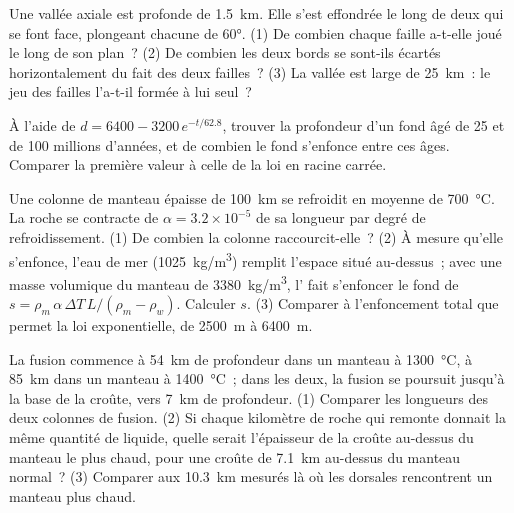 \begin{exercise}[$\star\star$]\label{exo:g11:ocean-ridges:10}
Une vallée axiale est profonde de \qty{1.5}{km}. Elle s'est effondrée le
long de deux  qui se font face, plongeant chacune de
\ang{60}. (1) De combien chaque faille a-t-elle joué le long de son plan~?
(2) De combien les deux bords se sont-ils écartés horizontalement du fait
des deux failles~? (3) La vallée est large de \qty{25}{km}~: le jeu des
failles l'a-t-il formée à lui seul~?
\end{exercise}

\begin{exercise}[$\star\star$]\label{exo:g11:ocean-ridges:11}
À l'aide de $d = 6400 - 3200\,e^{-t/62.8}$, trouver la profondeur d'un fond
âgé de 25 et de 100 millions d'années, et de combien le fond s'enfonce entre
ces âges. Comparer la première valeur à celle de la loi en racine carrée.
\end{exercise}

\begin{exercise}[$\star\star\star$]\label{exo:g11:ocean-ridges:12}
Une colonne de manteau épaisse de \qty{100}{km} se refroidit en moyenne de
\qty{700}{\celsius}. La roche se contracte de $\alpha = 3.2 \times 10^{-5}$
de sa longueur par degré de refroidissement. (1) De combien la colonne
raccourcit-elle~? (2) À mesure qu'elle s'enfonce, l'eau de mer
(\qty{1025}{kg/m^3}) remplit l'espace situé au-dessus~; avec une masse
volumique du manteau de \qty{3380}{kg/m^3}, l' fait s'enfoncer le
fond de $s = \rho_m\,\alpha\,\Delta T\,L/(\rho_m - \rho_w)$. Calculer $s$.
(3) Comparer à l'enfoncement total que permet la loi exponentielle, de
\qty{2500}{m} à \qty{6400}{m}.
\end{exercise}

\begin{exercise}[$\star\star\star$]\label{exo:g11:ocean-ridges:13}
La fusion commence à \qty{54}{km} de profondeur dans un manteau à
\qty{1300}{\celsius}, à \qty{85}{km} dans un manteau à \qty{1400}{\celsius}~;
dans les deux, la fusion se poursuit jusqu'à la base de la croûte, vers
\qty{7}{km} de profondeur. (1) Comparer les longueurs des deux colonnes de
fusion. (2) Si chaque kilomètre de roche qui remonte donnait la même
quantité de liquide, quelle serait l'épaisseur de la croûte au-dessus du
manteau le plus chaud, pour une croûte de \qty{7.1}{km} au-dessus du
manteau normal~? (3) Comparer aux \qty{10.3}{km} mesurés là où les dorsales
rencontrent un manteau plus chaud.
\end{exercise}

